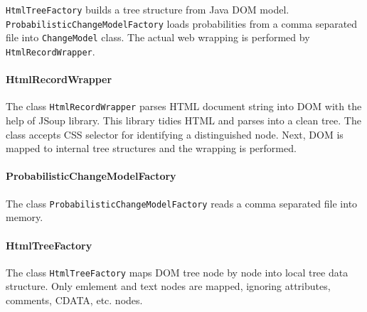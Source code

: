 \texttt{HtmlTreeFactory} builds a tree structure from Java DOM model. \texttt{ProbabilisticChangeModelFactory} loads probabilities from a comma separated file into \texttt{ChangeModel} class. The actual web wrapping is performed by \texttt{HtmlRecordWrapper}.


\paragraph{HtmlRecordWrapper} The class \texttt{HtmlRecordWrapper} parses HTML document string into DOM with the help of JSoup library. This library tidies HTML and parses into a clean tree. The class accepts CSS selector for identifying a distinguished node. Next, DOM is mapped to internal tree structures and the wrapping is performed.

\paragraph{ProbabilisticChangeModelFactory} The class \texttt{ProbabilisticChangeModelFactory} reads a comma separated file into memory.

\paragraph{HtmlTreeFactory} The class \texttt{HtmlTreeFactory} maps DOM tree node by node into local tree data structure. Only emlement and text nodes are mapped, ignoring attributes, comments, CDATA, etc. nodes.


